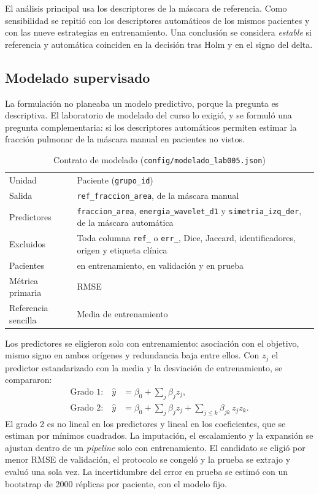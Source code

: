 El análisis principal usa los descriptores de la máscara de referencia. Como
sensibilidad se repitió con los descriptores automáticos de los mismos pacientes y
con las nueve estrategias en entrenamiento. Una conclusión se considera
\emph{estable} si referencia y automática coinciden en la decisión tras Holm y en
el signo del delta.

\subsection{Modelado supervisado}
\label{sec:met-modelo}

La formulación no planeaba un modelo predictivo, porque la pregunta es descriptiva.
El laboratorio de modelado del curso lo exigió, y se formuló una pregunta
complementaria: si los descriptores automáticos permiten estimar la fracción
pulmonar de la máscara manual en pacientes no vistos.

\begin{table}[H]
\centering
\small
\caption{Contrato de modelado (\texttt{config/modelado\_lab005.json})}
\begin{tabular}{@{}p{4cm}p{9.6cm}@{}}
\toprule
Unidad & Paciente (\texttt{grupo\_id}) \\
Salida & \texttt{ref\_fraccion\_area}, de la máscara manual \\
Predictores & \texttt{fraccion\_area}, \texttt{energia\_wavelet\_d1} y
\texttt{simetria\_izq\_der}, de la máscara automática \\
Excluidos & Toda columna \texttt{ref\_} o \texttt{err\_}, Dice, Jaccard,
identificadores, origen y etiqueta clínica \\
Pacientes & \ModNTrain{} en entrenamiento, \ModNVal{} en validación y \ModNTest{} en
prueba \\
Métrica primaria & RMSE \\
Referencia sencilla & Media de entrenamiento \\
\bottomrule
\end{tabular}
\end{table}

Los predictores se eligieron solo con entrenamiento: asociación con el objetivo,
mismo signo en ambos orígenes y redundancia baja entre ellos. Con $z_j$ el
predictor estandarizado con la media y la desviación de entrenamiento, se
compararon:
\begin{align}
\text{Grado 1:}\quad \hat{y} &= \beta_0 + \sum_{j} \beta_j z_j, \\
\text{Grado 2:}\quad \hat{y} &= \beta_0 + \sum_{j} \beta_j z_j
  + \sum_{j \le k} \beta_{jk}\, z_j z_k .
\end{align}
El grado 2 es no lineal en los predictores y lineal en los coeficientes, que se
estiman por mínimos cuadrados. La imputación, el escalamiento y la expansión se
ajustan dentro de un \emph{pipeline} solo con entrenamiento. El candidato se eligió
por menor RMSE de validación, el protocolo se congeló y la prueba se extrajo y
evaluó una sola vez. La incertidumbre del error en prueba se estimó con un
bootstrap de 2000 réplicas por paciente, con el modelo fijo.

